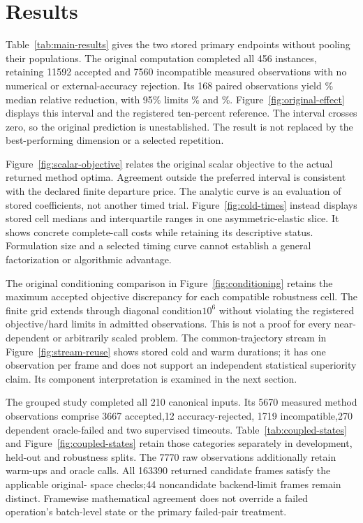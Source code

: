 \section{Results}\label{sec:results}
Table~\ref{tab:main-results} gives the two stored primary endpoints
without pooling their populations. The original computation completed
all 456 instances, retaining 11592 accepted and 7560 incompatible measured
observations with no numerical or external-accuracy rejection. Its
168 paired observations yield \OriginalEstimate\% median relative
reduction, with 95\% limits \OriginalLower\% and \OriginalUpper\%.
Figure~\ref{fig:original-effect} displays this interval and the
registered ten-percent reference. The interval crosses zero, so the
original prediction is unestablished. The result is not replaced by
the best-performing dimension or a selected repetition.



Figure~\ref{fig:scalar-objective} relates the original scalar objective
to the actual returned method optima. Agreement outside the preferred
interval is consistent with the declared finite departure price.
The analytic curve is an evaluation of stored coefficients, not
another timed trial. Figure~\ref{fig:cold-times} instead displays
stored cell medians and interquartile ranges in one asymmetric-elastic
slice. It shows concrete complete-call costs while retaining its
descriptive status. Formulation size and a selected timing curve
cannot establish a general factorization or algorithmic advantage.



The original conditioning comparison in
Figure~\ref{fig:conditioning} retains the maximum accepted objective
discrepancy for each compatible robustness cell. The finite grid
extends through diagonal condition$10^6$ without violating the
registered objective/hard limits in admitted observations. This is
not a proof for every near-dependent or arbitrarily scaled problem.
The common-trajectory stream in Figure~\ref{fig:stream-reuse} shows
stored cold and warm durations; it has one observation per frame
and does not support an independent statistical superiority claim.
Its component interpretation is examined in the next section.



The grouped study completed all 210 canonical inputs. Its 5670 measured
method observations comprise 3667 accepted,12 accuracy-rejected,
1719 incompatible,270 dependent oracle-failed and two supervised
timeouts. Table~\ref{tab:coupled-states} and
Figure~\ref{fig:coupled-states} retain those categories separately
in development, held-out and robustness splits. The 7770 raw
observations additionally retain warm-ups and oracle calls. All
163390 returned candidate frames satisfy the applicable original-
space checks;44 noncandidate backend-limit frames remain distinct.
Framewise mathematical agreement does not override a failed operation's
batch-level state or the primary failed-pair treatment.



